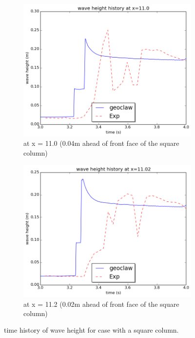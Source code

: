 \documentclass[11pt]{article}
\begin{document}
\begin{figure}[h!]
    \centering
    \begin{subfigure}[b]{0.4\textwidth}
        \includegraphics[width=1\textwidth]{./plots/waveheight_square_x11}
        \caption{at x = 11.0 (0.04m ahead of front face of the square column)}
        \label{fig:waveheight_square_x=11.0}
    \end{subfigure}
    \begin{subfigure}[b]{0.4\textwidth}
        \includegraphics[width=1\textwidth]{./plots/waveheight_square_x1102}
        \caption{at x = 11.2 (0.02m ahead of front face of the square column)}
        \label{fig:waveheight_square_x=11.02}
    \end{subfigure}
    \caption{time history of wave height for case with a square column.}
\end{figure}
\end{document}
